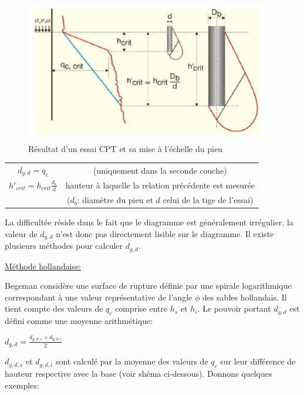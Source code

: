         \begin{figure}[h!]
            \centering
            \includegraphics{Holeyman/images/H39.PNG}
            \caption{Résultat d’un essai CPT et sa mise à l’échelle du pieu}
        \end{figure}
        
        \begin{center}
        \begin{tabular}{cc}
            $d_{g,d} = q_c$ \: \: \: 
                &  (uniquement dans la seconde couche)  \\
            $h'_{crit} = h_{crit} \frac{d_b}{d}$ 
                &  hauteur à laquelle la relation précédente est mesurée  \\
                 &  ($d_b$: diamètre du pieu et $d$ celui de la tige de l'essai)   
        \end{tabular}
        \end{center} 
        
        La difficultée réside dans le fait que le diagramme est généralement irrégulier, la valeur de $d_{g,d}$ n'est donc pas directement lisible sur le diagramme. Il existe plusieurs méthodes pour calculer $d_{g,d}$.
        
        \underline{Méthode hollandaise:} 
        
        Begeman considère une surface de rupture définie par une spirale logarithmique correspondant à une valeur représentative de l'angle $\phi$ des sables hollandais. Il tient compte des valeurs de $q_c$ comprise entre $h_s$ et $h_i$. Le pouvoir portant $d_{g,d}$ est défini comme une moyenne arithmétique:
        
        \begin{center}
            $d_{g,d} = \frac{d_{g,d,s} + d_{g,d,i}}{2}$
        \end{center} 
        
        $d_{g,d,s}$ et $d_{g,d,i}$ sont calculé par la moyenne des valeurs de $q_c$ sur leur différence de hauteur respective avec la base (voir shéma ci-dessous). Donnons quelques exemples: 
        
